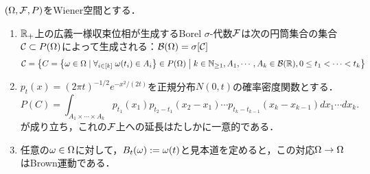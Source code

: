 \documentclass[uplatex,dvipdfmx]{jsreport}
\begin{document}
\begin{proposition}[Wiener測度の構成]\label{prop-construction-of-Wiener-measure}
    $(\Omega,\mathcal{F},P)$をWiener空間とする．
    \begin{enumerate}
        \item $\mathbb{R}_+$上の広義一様収束位相が生成するBorel $\sigma$-代数$\mathcal{F}$は次の円筒集合の集合$\mathcal{C}\subset P(\Omega)$によって生成される：$\mathcal{B}(\Omega)=\sigma[\mathcal{C}]$
        \[\mathcal{C}=\left\{C=\left\{\omega\in\Omega\mid\forall_{i\in[k]}\;\omega(t_i)\in A_i\right\}\in P(\Omega)\;\middle|\;k\in\mathbb{N}_{\ge1},A_1,\cdots,A_k\in\mathcal{B}(\mathbb{R}),0\le t_1<\cdots<t_k\right\}\]
        \item $p_t(x)=(2\pi t)^{-1/2}e^{-x^2/(2t)}$を正規分布$N(0,t)$の確率密度関数とする．
        \[P(C)=\int_{A_1\times\cdots\times A_k}p_{t_1}(x_1)p_{t_2-t_1}(x_2-x_1)\cdots p_{t_k-t_{k-1}}(x_k-x_{k-1})dx_1\cdots dx_k.\]
        が成り立ち，これの$\mathcal{F}$上への延長はたしかに一意的である．
        \item 任意の$\omega\in\Omega$に対して，$B_t(\omega):=\omega(t)$と見本道を定めると，この対応$\Omega\to\Omega$はBrown運動である．
    \end{enumerate}
\end{proposition}
\end{document}
